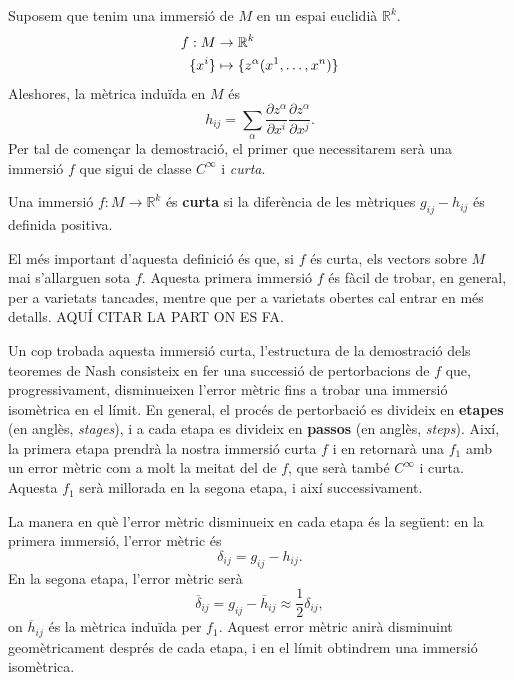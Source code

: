 Suposem que tenim una immersió de $M$ en un espai euclidià $\mathbb R^k$.
\begin{align*}
    f:M&\to \mathbb R^k \\
    \{x^i\} &\mapsto \{z^\alpha(x^1, \dots, x^n)\} 
\end{align*}
Aleshores, la mètrica induïda en $M$ és 
\begin{equation}
    h_{ij} = \sum_\alpha \frac{\partial z^\alpha}{\partial x^i}\frac{\partial z^\alpha}{\partial x^j}.
\end{equation}
Per tal de començar la demostració, el primer que necessitarem serà una immersió $f$ que sigui de classe $C^\infty$ i \textit{curta}.
\begin{defi}
    Una immersió $f:M\to \mathbb R^k$ és \textbf{curta} si la diferència de les mètriques $g_{ij}-h_{ij}$ és definida positiva.
\end{defi}
El més important d'aquesta definició és que, si $f$ és curta, els vectors sobre $M$ mai s'allarguen sota $f$. Aquesta primera immersió $f$ és fàcil de trobar, en general, per a varietats tancades, mentre que per a varietats obertes cal entrar en més detalls. {\color{blue}  AQUÍ CITAR LA PART ON ES FA.}

Un cop trobada aquesta immersió curta, l'estructura de la demostració dels teoremes de Nash consisteix en fer una successió de pertorbacions de $f$ que, progressivament, disminueixen l'error mètric fins a trobar una immersió isomètrica en el límit. En general, el procés de pertorbació es divideix en \textbf{etapes} (en anglès, \textit{stages}), i a cada etapa es divideix en \textbf{passos} (en anglès, \textit{steps}). Així, la primera etapa prendrà la nostra immersió curta $f$ i en retornarà una $f_1$ amb un error mètric com a molt la meitat del de $f$, que serà també $C^\infty$ i curta. Aquesta $f_1$ serà millorada en la segona etapa, i així successivament.

La manera en què l'error mètric disminueix en cada etapa és la següent: en la primera immersió, l'error mètric és 
\begin{equation}
    \delta_{ij} = g_{ij}-h_{ij}.
\end{equation}
En la segona etapa, l'error mètric serà
\begin{equation}
    \overline\delta_{ij} = g_{ij}-\overline{h}_{ij}\approx \frac12\delta_{ij},
\end{equation}
on $\overline{h}_{ij}$ és la mètrica induïda per $f_1$. Aquest error mètric anirà disminuint geomètricament després de cada etapa, i en el límit obtindrem una immersió isomètrica.

